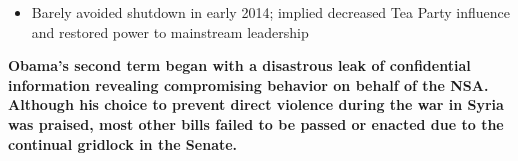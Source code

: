 \documentclass[a4paper]{article}
\begin{document}
{\begin{itemize}
                \begin{itemize}
                    \item Barely avoided shutdown in early 2014; implied decreased Tea Party influence and restored power to mainstream leadership
                \end{itemize}
            \end{itemize}
            \textbf{Obama's second term began with a disastrous leak of confidential information revealing compromising behavior on behalf of the NSA. Although his choice to prevent direct violence during the war in Syria was praised, most other bills failed to be passed or enacted due to the continual gridlock in the Senate.}
        }
    
\end{document}
